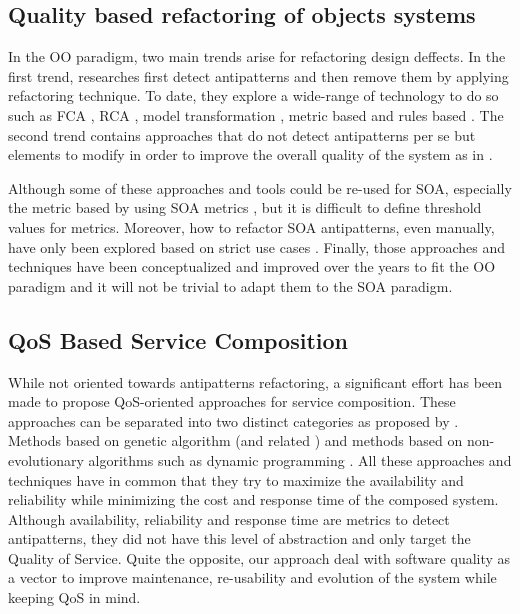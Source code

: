 \documentclass[lnbip]{svmultln}
\begin{document}
\subsection{Quality based refactoring of objects systems}
In the OO paradigm, two main trends arise for refactoring design deffects. In the first trend, researches first detect antipatterns and then remove them by applying refactoring technique. To date, they explore a wide-range of technology to do so such as FCA \cite{moha2008using}, RCA \cite{moha2008refactorings}, model transformation \cite{moha2009generic}, metric based \cite{erni1996applying, fenton1998software, Moha2010} and rules based \cite{opdyke1992refactoring}.
The second trend contains approaches that do not detect antipatterns per se but elements to modify in order to improve the overall quality of the system as in \cite{o2008search}.

Although some of these approaches and tools could be re-used for SOA, especially the metric based by using SOA metrics \cite{Nayrolles,Palma, demange2013,  Nayrolles2013a}, but it is difficult to define threshold values for metrics. Moreover, how to refactor SOA antipatterns, even manually, have only been explored based on strict use cases \cite{zhu2009refactoring, kim2007service}. Finally, those approaches and techniques have been conceptualized and improved over the years to fit the OO paradigm and it will not be trivial to adapt them to the SOA paradigm. 

\subsection{QoS Based Service Composition}

While not oriented towards antipatterns refactoring, a significant effort has been made to propose  QoS-oriented  approaches for service composition. These approaches can be separated into two distinct categories as proposed by \cite{Pejman2012}. Methods based on genetic algorithm \cite{canfora2005approach, zeng2003quality} (and related \cite{xu2008towards, ming2007approach}) and methods based on non-evolutionary algorithms such as dynamic programming \cite{yu2005service}.  All these approaches and techniques have in common that they try to maximize the availability and reliability while minimizing the cost and response time of the composed system. Although availability, reliability and response time are metrics to detect antipatterns, they did not have this level of abstraction and only target the Quality of Service. Quite the opposite, our approach deal with software quality as a vector to improve maintenance, re-usability and evolution of the system while keeping QoS in mind.
\end{document}
